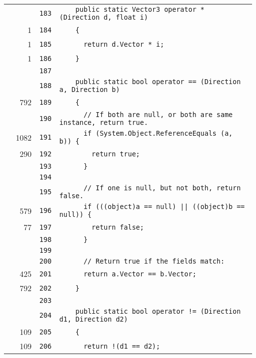 \documentclass[a4paper,10pt]{article}
\begin{document}
\begin{longtable}[l]{lrrl}
\cellcolor{gray} &  & \verb~183~ & \verb~    public static Vector3 operator * (Direction d, float i)~\\
\cellcolor{green} & 1 & \verb~184~ & \verb~    {~\\
\cellcolor{green} & 1 & \verb~185~ & \verb~      return d.Vector * i;~\\
\cellcolor{green} & 1 & \verb~186~ & \verb~    }~\\
\cellcolor{gray} &  & \verb~187~ & \verb~~\\
\cellcolor{gray} &  & \verb~188~ & \verb~    public static bool operator == (Direction a, Direction b)~\\
\cellcolor{green} & 792 & \verb~189~ & \verb~    {~\\
\cellcolor{gray} &  & \verb~190~ & \verb~      // If both are null, or both are same instance, return true.~\\
\cellcolor{green} & 1082 & \verb~191~ & \verb~      if (System.Object.ReferenceEquals (a, b)) {~\\
\cellcolor{green} & 290 & \verb~192~ & \verb~        return true;~\\
\cellcolor{gray} &  & \verb~193~ & \verb~      }~\\
\cellcolor{gray} &  & \verb~194~ & \verb~~\\
\cellcolor{gray} &  & \verb~195~ & \verb~      // If one is null, but not both, return false.~\\
\cellcolor{green} & 579 & \verb~196~ & \verb~      if (((object)a == null) || ((object)b == null)) {~\\
\cellcolor{green} & 77 & \verb~197~ & \verb~        return false;~\\
\cellcolor{gray} &  & \verb~198~ & \verb~      }~\\
\cellcolor{gray} &  & \verb~199~ & \verb~~\\
\cellcolor{gray} &  & \verb~200~ & \verb~      // Return true if the fields match:~\\
\cellcolor{green} & 425 & \verb~201~ & \verb~      return a.Vector == b.Vector;~\\
\cellcolor{green} & 792 & \verb~202~ & \verb~    }~\\
\cellcolor{gray} &  & \verb~203~ & \verb~~\\
\cellcolor{gray} &  & \verb~204~ & \verb~    public static bool operator != (Direction d1, Direction d2)~\\
\cellcolor{green} & 109 & \verb~205~ & \verb~    {~\\
\cellcolor{green} & 109 & \verb~206~ & \verb~      return !(d1 == d2);~\\

\end{longtable}
\end{document}
